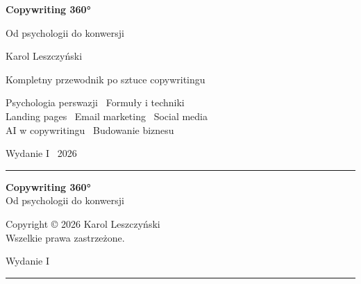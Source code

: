 \thispagestyle{empty}
\begin{center}
\vspace*{4cm}

{\fontsize{48}{52}\selectfont\bfseries\color{primarydark}Copywriting 360°}

\vspace{0.5cm}

{\LARGE\color{textmuted}Od psychologii do konwersji}

\vspace{3cm}

{\Large Karol Leszczyński}

\vspace{4cm}

\begin{minipage}{0.7\textwidth}
\centering
{\large\color{primaryblue}Kompletny przewodnik po sztuce copywritingu}

\vspace{1cm}

\color{textmuted}
Psychologia perswazji \textbullet\ Formuły i techniki\\[8pt]
Landing pages \textbullet\ Email marketing \textbullet\ Social media\\[8pt]
AI w copywritingu \textbullet\ Budowanie biznesu
\end{minipage}

\vfill

{\color{textmuted}Wydanie I \textbullet\ 2026}

\vspace{0.5cm}

{\color{primaryblue}\rule{0.3\textwidth}{2pt}}

\end{center}
\clearpage

\thispagestyle{empty}
\vspace*{\fill}
\begin{center}
\small\color{textmuted}

\textbf{Copywriting 360°}\\
Od psychologii do konwersji

\vspace{1.5cm}

Copyright © 2026 Karol Leszczyński\\
Wszelkie prawa zastrzeżone.

\vspace{1.5cm}

Wydanie I

\vspace{2cm}

{\color{primaryblue}\rule{0.15\textwidth}{0.5pt}}

\vspace{1.5cm}

\end{center}
\vspace*{\fill}
\cleardoublepage

